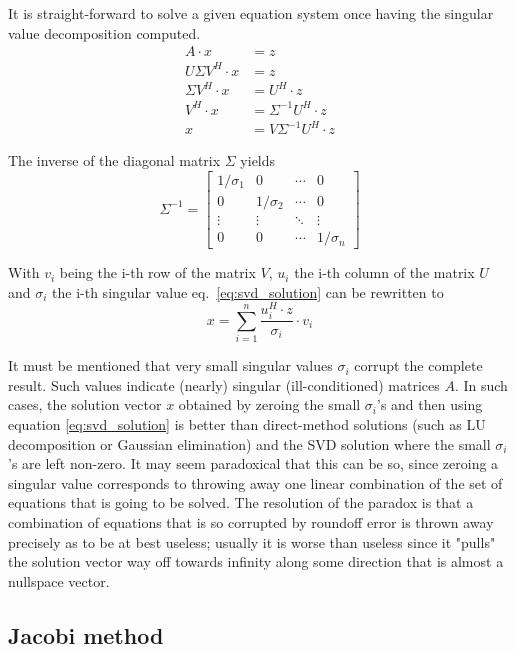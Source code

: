 It is straight-forward to solve a given equation system once having
the singular value decomposition computed.
\begin{align}
A\cdot x &= z\\
U\Sigma V^H\cdot x &= z\\
\Sigma V^H\cdot x &= U^H \cdot z\\
V^H\cdot x &= \Sigma^{-1} U^H \cdot z\\
x &= V\Sigma^{-1} U^H \cdot z
\label{eq:svd_solution}
\end{align}

The inverse of the diagonal matrix $\Sigma$ yields
\begin{equation}
\Sigma^{-1} =
\begin{bmatrix}
1/\sigma_1 & 0 & \cdots & 0\\
0 & 1/\sigma_2 & \cdots & 0\\
\vdots & \vdots & \ddots & \vdots\\
0 & 0 & \cdots & 1/\sigma_n
\end{bmatrix}
\end{equation}

With $v_i$ being the i-th row of the matrix $V$, $u_i$ the i-th column
of the matrix $U$ and $\sigma_i$ the i-th singular value
eq.~\eqref{eq:svd_solution} can be rewritten to
\begin{equation}
x = \sum_{i=1}^{n} \dfrac{u_i^H\cdot z}{\sigma_i}\cdot v_i
\end{equation}

It must be mentioned that very small singular values $\sigma_i$
corrupt the complete result.  Such values indicate (nearly) singular
(ill-conditioned) matrices $A$.  In such cases, the solution vector
$x$ obtained by zeroing the small $\sigma_i$'s and then using equation
\eqref{eq:svd_solution} is better than direct-method solutions (such
as LU decomposition or Gaussian elimination) and the SVD solution
where the small $\sigma_i$'s are left non-zero. It may seem
paradoxical that this can be so, since zeroing a singular value
corresponds to throwing away one linear combination of the set of
equations that is going to be solved.  The resolution of the paradox
is that a combination of equations that is so corrupted by roundoff
error is thrown away precisely as to be at best useless; usually it is
worse than useless since it "pulls" the solution vector way off
towards infinity along some direction that is almost a nullspace
vector.

\subsection{Jacobi method}

